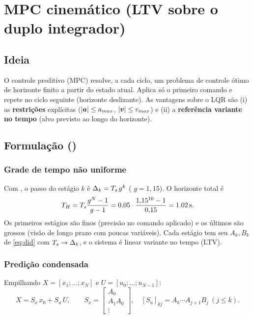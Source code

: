 \chapter{MPC cinemático (LTV sobre o duplo integrador)}
\label{cap:mpc}

\section{Ideia}
O controle preditivo (MPC) resolve, a cada ciclo, um problema de controle ótimo de
horizonte finito a partir do estado atual. Aplica só o primeiro comando e repete no
ciclo seguinte (horizonte deslizante). As vantagens sobre o LQR são
(i) as \textbf{restrições} explícitas ($|\bm{a}|\le a_{max}$, $|\bm{v}|\le v_{max}$) e
(ii) a \textbf{referência variante no tempo} (alvo previsto ao longo do horizonte).

\section{Formulação ()}
\subsection{Grade de tempo não uniforme}
Com , o passo do estágio $k$ é $\Delta_k = T_s\,g^k$
( $g=1{,}15$). O horizonte total é
\begin{equation}
  T_H = T_s\frac{g^N-1}{g-1} = 0{,}05\cdot\frac{1{,}15^{10}-1}{0{,}15}=\SI{1,02}{s}.
\end{equation}
Os primeiros estágios são finos (precisão no comando aplicado) e os últimos são
grossos (visão de longo prazo com poucas variáveis). Cada estágio tem seu
$A_k,B_k$ de \eqref{eq:did} com $T_s\to\Delta_k$, e o sistema é linear variante no
tempo (LTV).

\subsection{Predição condensada}
Empilhando $X=[x_1;\dots;x_N]$ e $U=[u_0;\dots;u_{N-1}]$:
\begin{equation}
  X = S_x\,x_0 + S_u\,U,\qquad
  S_x = \begin{bmatrix}A_0\\A_1A_0\\ \vdots\end{bmatrix},\quad
  [S_u]_{kj} = A_{k}\cdots A_{j+1}B_j\ (j\le k).
\end{equation}
